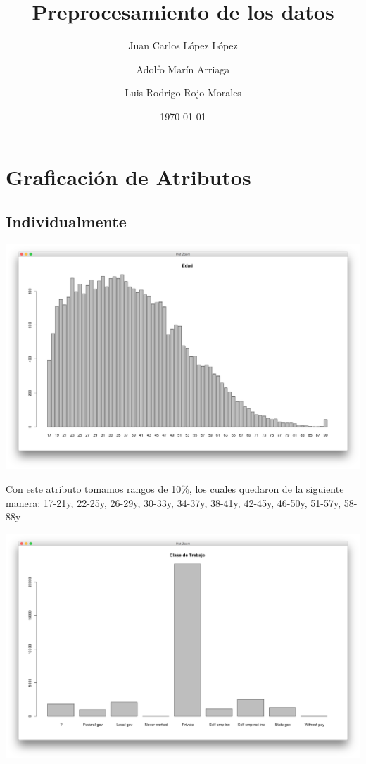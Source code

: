 \documentclass{article}
\title{Preprocesamiento de los datos}
\author{Juan Carlos López López \and Adolfo Marín Arriaga \and Luis Rodrigo Rojo Morales}
\date{\today\\}
\begin{document}
 \maketitle
 \section{Graficación de Atributos}
 \subsection{Individualmente}
 \begin{center}
   \hbox{\hspace{-5.8em}\includegraphics[scale=0.4]{graficas/edad}}
 \end{center}
 Con este atributo tomamos rangos de 10\%, los cuales quedaron de la siguiente manera: 17-21y, 22-25y, 26-29y, 30-33y, 34-37y, 38-41y, 42-45y, 46-50y, 51-57y, 58-88y
 \begin{center}
   \hbox{\hspace{-5.8em}\includegraphics[scale=0.4]{graficas/claseDeTrabajo}}
 \end{center}
\end{document}
